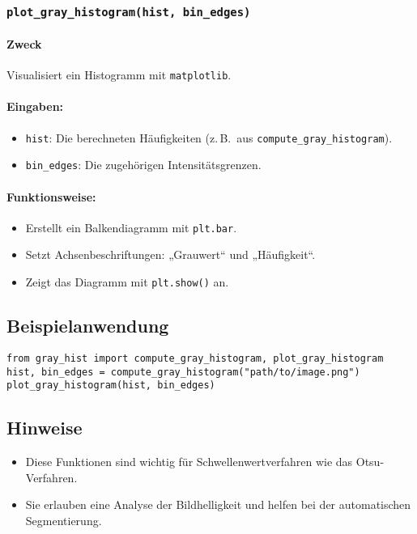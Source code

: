 \documentclass[a4paper,12pt]{article}
\begin{document}
\subsubsection*{\texttt{plot\_gray\_histogram(hist, bin\_edges)}}

\paragraph{Zweck}
Visualisiert ein Histogramm mit \texttt{matplotlib}.

\paragraph{Eingaben:}
\begin{itemize}
  \item \texttt{hist}: Die berechneten Häufigkeiten (z.\,B.\ aus \texttt{compute\_gray\_histogram}).
  \item \texttt{bin\_edges}: Die zugehörigen Intensitätsgrenzen.
\end{itemize}

\paragraph{Funktionsweise:}
\begin{itemize}
  \item Erstellt ein Balkendiagramm mit \texttt{plt.bar}.
  \item Setzt Achsenbeschriftungen: „Grauwert“ und „Häufigkeit“.
  \item Zeigt das Diagramm mit \texttt{plt.show()} an.
\end{itemize}

\subsection*{Beispielanwendung}

\begin{verbatim}
from gray_hist import compute_gray_histogram, plot_gray_histogram
hist, bin_edges = compute_gray_histogram("path/to/image.png")
plot_gray_histogram(hist, bin_edges)
\end{verbatim}

\subsection*{Hinweise}
\begin{itemize}
  \item Diese Funktionen sind wichtig für Schwellenwertverfahren wie das Otsu-Verfahren.
  \item Sie erlauben eine Analyse der Bildhelligkeit und helfen bei der automatischen Segmentierung.
\end{itemize}
\end{document}
